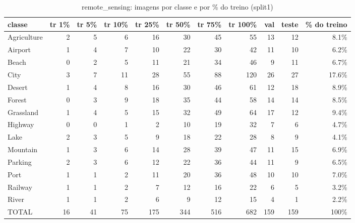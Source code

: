 \begin{table}[h]\centering\small
\caption{remote_sensing: imagens por classe e por \% do treino (split1)}
\begin{tabular}{lrrrrrrrrrr}\toprule
classe & tr 1\% & tr 5\% & tr 10\% & tr 25\% & tr 50\% & tr 75\% & tr 100\% & val & teste & \% do treino \\\midrule
Agriculture & 2 & 5 & 6 & 16 & 30 & 45 & 55 & 13 & 12 & 8.1\% \\
Airport & 1 & 4 & 7 & 10 & 22 & 30 & 42 & 11 & 10 & 6.2\% \\
Beach & 0 & 2 & 5 & 11 & 21 & 34 & 46 & 9 & 11 & 6.7\% \\
City & 3 & 7 & 11 & 28 & 55 & 88 & 120 & 26 & 27 & 17.6\% \\
Desert & 1 & 4 & 8 & 16 & 30 & 46 & 61 & 12 & 18 & 8.9\% \\
Forest & 0 & 3 & 9 & 18 & 35 & 44 & 58 & 14 & 14 & 8.5\% \\
Grassland & 1 & 4 & 5 & 15 & 32 & 49 & 64 & 17 & 12 & 9.4\% \\
Highway & 0 & 0 & 1 & 2 & 10 & 19 & 32 & 7 & 6 & 4.7\% \\
Lake & 2 & 3 & 5 & 9 & 18 & 22 & 28 & 8 & 9 & 4.1\% \\
Mountain & 1 & 3 & 6 & 14 & 28 & 39 & 47 & 11 & 15 & 6.9\% \\
Parking & 2 & 3 & 6 & 12 & 22 & 36 & 44 & 11 & 9 & 6.5\% \\
Port & 1 & 1 & 2 & 11 & 20 & 36 & 48 & 10 & 10 & 7.0\% \\
Railway & 1 & 1 & 2 & 7 & 12 & 16 & 22 & 6 & 5 & 3.2\% \\
River & 1 & 1 & 2 & 6 & 9 & 12 & 15 & 4 & 1 & 2.2\% \\
\midrule TOTAL & 16 & 41 & 75 & 175 & 344 & 516 & 682 & 159 & 159 & 100\% \\\bottomrule
\end{tabular}\end{table}

